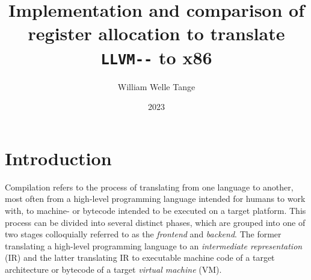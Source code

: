 \documentclass{article}
\title{Implementation and comparison of register allocation to translate \lstinline!LLVM--! to x86}
\author{William Welle Tange}
\date{2023}
\begin{document}
\maketitle

\tableofcontents
\newpage



    

\section{Introduction}

Compilation refers to the process of translating from one language to another, most often from a high-level programming language intended for humans to work with, to machine- or bytecode intended to be executed on a target platform. This process can be divided into several distinct phases, which are grouped into one of two stages colloquially referred to as the \textit{frontend} and \textit{backend}. The former translating a high-level programming language to an \textit{intermediate representation} (IR) and the latter translating IR to executable machine code of a target architecture or bytecode of a target \textit{virtual machine} (VM).
\end{document}

